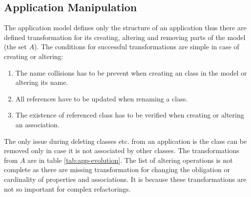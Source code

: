 \documentclass[runningheads]{comsis}
\begin{document}
\subsection{Application Manipulation}
\label{sec:app-evolution}
The application model defines only the structure of an application thus there are defined transformation for its creating, altering and removing parts of the model (the set $A$). The conditions for successful transformations are simple in case of creating or altering:
\begin{enumerate}
	\item The name collisions has to be prevent when creating an class in the model or altering its name.
	\item All references have to be updated when renaming a class.
	\item The existence of referenced class has to be verified when creating or altering an association.  
\end{enumerate}
The only issue during deleting classes etc. from an application is the class can be removed only in case it is not associated by other classes. The transformations from $A$ are in table \ref{tab:app-evolution}. The list of altering operations is not complete as there are missing transformation for changing the obligation or cardinality of properties and associations. It is because these transformations are not so important for complex refactorings. 
\end{document}
